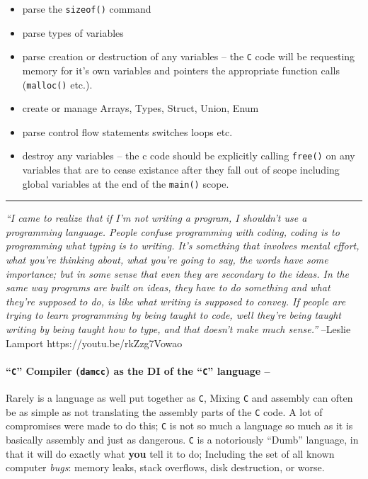 \begin{itemize}
\tightlist
\item
  parse the \texttt{sizeof()} command
\item
  parse types of variables
\item
  parse creation or destruction of any variables -- the \texttt{C} code
  will be requesting memory for it's own variables and pointers the
  appropriate function calls (\texttt{malloc()} etc.).
\item
  create or manage Arrays, Types, Struct, Union, Enum
\item
  parse control flow statements switches loops etc.
\item
  destroy any variables -- the c code should be explicitly calling
  \texttt{free()} on any variables that are to cease existance after
  they fall out of scope including global variables at the end of the
  \texttt{main()} scope.
\end{itemize}

\begin{center}\rule{0.5\linewidth}{0.5pt}\end{center}

\emph{``I came to realize that if I'm not writing a program, I shouldn't
use a programming language. People confuse programming with coding,
coding is to programming what typing is to writing. It's something that
involves mental effort, what you're thinking about, what you're going to
say, the words have some importance; but in some sense that even they
are secondary to the ideas. In the same way programs are built on ideas,
they have to do something and what they're supposed to do, is like what
writing is supposed to convey. If people are trying to learn programming
by being taught to code, well they're being taught writing by being
taught how to type, and that doesn't make much sense.''} --Leslie
Lamport https://youtu.be/rkZzg7Vowao

\hypertarget{c-compiler-damcc-as-the-di-of-the-c-language}{%
\paragraph{\texorpdfstring{``\texttt{C}'' Compiler (\texttt{damcc}) as
the DI of the ``\texttt{C}'' language
--}{``C'' Compiler (damcc) as the DI of the ``C'' language --}}\label{c-compiler-damcc-as-the-di-of-the-c-language}}

Rarely is a language as well put together as \texttt{C}, Mixing
\texttt{C} and assembly can often be as simple as not translating the
assembly parts of the \texttt{C} code. A lot of compromises were made to
do this; \texttt{C} is not so much a language so much as it is basically
assembly and just as dangerous. \texttt{C} is a notoriously ``Dumb''
language, in that it will do exactly what \textbf{you} tell it to do;
Including the set of all known computer \emph{bugs}: memory leaks, stack
overflows, disk destruction, or worse.

